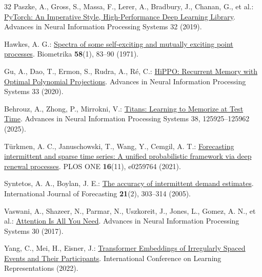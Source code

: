 \documentclass[runningheads]{llncs}
\begin{document}
\begin{thebibliography}{32}
Paszke, A., Gross, S., Massa, F., Lerer, A., Bradbury, J., Chanan, G., et al.: \href{https://proceedings.neurips.cc/paper/2019/hash/bdbca288fee7f92f2bfa9f7012727740-Abstract.html}{PyTorch: An Imperative Style, High-Performance Deep Learning Library}. Advances in Neural Information Processing Systems 32 (2019).

Hawkes, A. G.: \href{https://academic.oup.com/biomet/article-abstract/58/1/83/224809}{Spectra of some self-exciting and mutually exciting point processes}. Biometrika \textbf{58}(1), 83--90 (1971). 

Gu, A., Dao, T., Ermon, S., Rudra, A., R\'{e}, C.: \href{https://proceedings.neurips.cc/paper/2020/hash/102f0bb6efb3a6128a3c750dd16729be-Abstract.html}{HiPPO: Recurrent Memory with Optimal Polynomial Projections}. Advances in Neural Information Processing Systems 33 (2020).

Behrouz, A., Zhong, P., Mirrokni, V.: \href{https://papers.nips.cc/paper_files/paper/2025/hash/a4ca07aa108036f80cbb5b82285fd4b1-Abstract-Conference.html}{Titans: Learning to Memorize at Test Time}. Advances in Neural Information Processing Systems 38, 125925--125962 (2025). 

T\"{u}rkmen, A. C., Januschowski, T., Wang, Y., Cemgil, A. T.: \href{https://journals.plos.org/plosone/article?id=10.1371/journal.pone.0259764}{Forecasting intermittent and sparse time series: A unified probabilistic framework via deep renewal processes}. PLOS ONE \textbf{16}(11), e0259764 (2021). 

Syntetos, A. A., Boylan, J. E.: \href{https://www.sciencedirect.com/science/article/pii/S0169207004000792}{The accuracy of intermittent demand estimates}. International Journal of Forecasting \textbf{21}(2), 303--314 (2005). 

Vaswani, A., Shazeer, N., Parmar, N., Uszkoreit, J., Jones, L., Gomez, A. N., et al.: \href{https://proceedings.neurips.cc/paper/2017/hash/3f5ee243547dee91fbd053c1c4a845aa-Abstract.html}{Attention Is All You Need}. Advances in Neural Information Processing Systems 30 (2017).

Yang, C., Mei, H., Eisner, J.: \href{https://openreview.net/forum?id=Rty5g9imm7H}{Transformer Embeddings of Irregularly Spaced Events and Their Participants}. International Conference on Learning Representations (2022).


\end{thebibliography}
\end{document}
